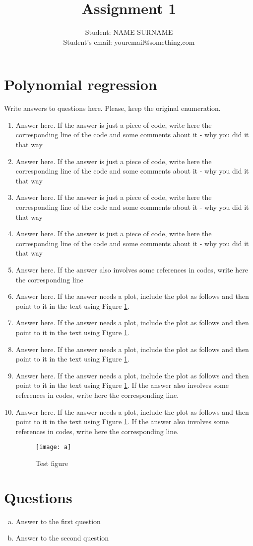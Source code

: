 \documentclass[a4paper]{article}
\title{Assignment 1}
\author{Student: NAME SURNAME\\Student's email: youremail@something.com} %
\date{}
\begin{document}
	\maketitle
	
	\section*{Polynomial regression}
	Write answers to questions here. Please, keep the original enumeration.
	\begin{enumerate}
		\item Answer here. If the answer is just a piece of code, write here the corresponding line of the code and some comments about it - why you did it that way
		\item  Answer here. If the answer is just a piece of code, write here the corresponding line of the code and some comments about it - why you did it that way
		\item Answer here. If the answer is just a piece of code, write here the corresponding line of the code and some comments about it - why you did it that way
		\item Answer here. If the answer is just a piece of code, write here the corresponding line of the code and some comments about it - why you did it that way
		\item Answer here. If the answer also involves some references in codes, write here the corresponding line
		\item Answer here. If the answer needs a plot, include the plot as follows and then point to it in the text using Figure \ref{fig:test}.
		\item Answer here. If the answer needs a plot, include the plot as follows and then point to it in the text using Figure \ref{fig:test}.
		\item Answer here. If the answer needs a plot, include the plot as follows and then point to it in the text using Figure \ref{fig:test}.
		\item Answer here. If the answer needs a plot, include the plot as follows and then point to it in the text using Figure \ref{fig:test}.  If the answer also involves some references in codes, write here the corresponding line.
		\item Answer here. If the answer needs a plot, include the plot as follows and then point to it in the text using Figure \ref{fig:test}.  If the answer also involves some references in codes, write here the corresponding line.
		
		\begin{figure}
			\centering
			\texttt{[image: a]}
			\caption{Test figure}
			\label{fig:test}
		\end{figure}
	\end{enumerate}
	
	\section*{Questions}
	\begin{enumerate}[(a)]
		\item Answer to the first question
		\item Answer to the second question
	\end{enumerate}
	
	
\end{document}

